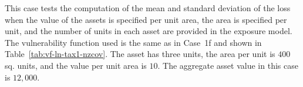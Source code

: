 This case tests the computation of the mean and standard deviation of the loss when the value of the assets is specified per unit area, the area is specified per unit, and the number of units in each asset are provided in the exposure model. The vulnerability function used is the same as in Case~1f and shown in Table~\ref{tab:vf-ln-tax1-nzcov}. The asset has three units, the area per unit is $400$ sq. units, and the value per unit area is $10$. The aggregate asset value in this case is $12,000$.